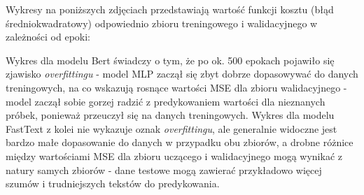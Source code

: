 \documentclass{article}
\begin{document}
    \noindent Wykresy na poniższych zdjęciach przedstawiają wartość funkcji kosztu (błąd średniokwadratowy) odpowiednio zbioru treningowego i walidacyjnego w zależności od epoki:

    \noindent Wykres dla modelu Bert świadczy o tym, że po ok. 500 epokach pojawiło się zjawisko \textit{overfittingu} - model MLP zaczął się zbyt dobrze dopasowywać do danych treningowych, na co wskazują rosnące wartości MSE dla zbioru walidacyjnego - model zaczął sobie gorzej radzić z predykowaniem wartości dla nieznanych próbek, ponieważ przeuczył się na danych treningowych. Wykres dla modelu FastText z kolei nie wykazuje oznak \textit{overfittingu}, ale generalnie widoczne jest bardzo małe dopasowanie do danych w przypadku obu zbiorów, a drobne różnice między wartościami MSE dla zbioru uczącego i walidacyjnego mogą wynikać z natury samych zbiorów - dane testowe mogą zawierać przykładowo więcej szumów i trudniejszych tekstów do predykowania.

\vspace{1cm}
\hrulefill


\end{document}
